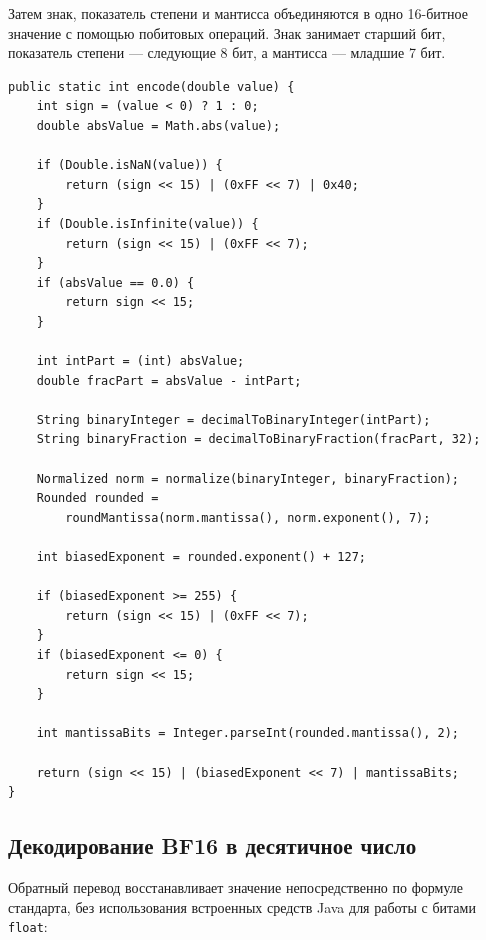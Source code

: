 \documentclass[12pt,a4paper]{article}
\begin{document}
Затем знак, показатель степени и мантисса объединяются в одно 16-битное
значение с помощью побитовых операций. Знак занимает старший бит,
показатель степени --- следующие 8 бит, а мантисса --- младшие 7 бит.

\begin{lstlisting}[caption={Кодирование double в BF16}]
public static int encode(double value) {
    int sign = (value < 0) ? 1 : 0;
    double absValue = Math.abs(value);

    if (Double.isNaN(value)) {
        return (sign << 15) | (0xFF << 7) | 0x40;
    }
    if (Double.isInfinite(value)) {
        return (sign << 15) | (0xFF << 7);
    }
    if (absValue == 0.0) {
        return sign << 15;
    }

    int intPart = (int) absValue;
    double fracPart = absValue - intPart;

    String binaryInteger = decimalToBinaryInteger(intPart);
    String binaryFraction = decimalToBinaryFraction(fracPart, 32);

    Normalized norm = normalize(binaryInteger, binaryFraction);
    Rounded rounded =
        roundMantissa(norm.mantissa(), norm.exponent(), 7);

    int biasedExponent = rounded.exponent() + 127;

    if (biasedExponent >= 255) {
        return (sign << 15) | (0xFF << 7);
    }
    if (biasedExponent <= 0) {
        return sign << 15;
    }

    int mantissaBits = Integer.parseInt(rounded.mantissa(), 2);

    return (sign << 15) | (biasedExponent << 7) | mantissaBits;
}
\end{lstlisting}

\subsection{Декодирование BF16 в десятичное число}

Обратный перевод восстанавливает значение непосредственно по формуле
стандарта, без использования встроенных средств Java для работы с битами
\texttt{float}:
\end{document}
